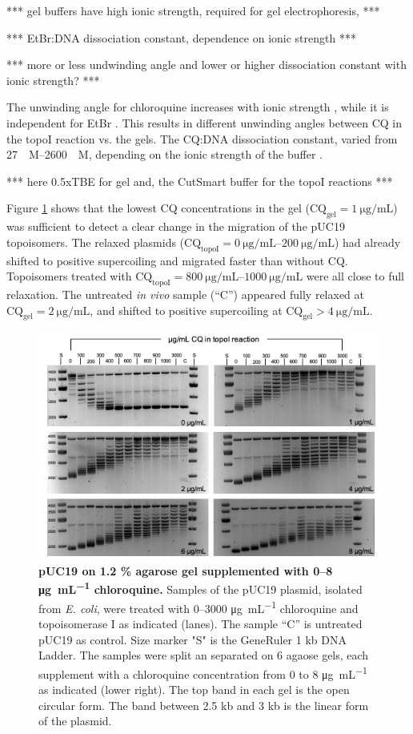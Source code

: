 \documentclass[10pt,letterpaper]{article}
\newcommand{\ugml}{\micro\gram\per\milli\liter}
\newcommand{\uM}{\micro\textsc{M}}%
\newcommand{\cqgel}{\ensuremath{\text{CQ}_{\text{gel}}}}
\newcommand{\cqtop}{\ensuremath{\text{CQ}_{\text{topoI}}}}
\newcommand{\TODO}[1]{\begingroup\color{red}*** #1 ***\endgroup}
\begin{document}
\TODO{gel buffers have high ionic strength, required for gel electrophoresis,}

\TODO{EtBr:DNA dissociation constant, dependence on ionic strength}

\TODO{more or less undwinding angle and lower or higher dissociation
  constant with ionic strength?}


The unwinding angle for chloroquine increases with ionic strength
\cite{Jones1980}, while it is independent for EtBr
. This results in different unwinding angles between CQ
in the topoI reaction vs. the gels. The CQ:DNA dissociation constant,
varied from \SIrange{27}{2600}{\uM}, depending on the ionic strength
of the buffer \cite{KwakyeBerko1989}.

\TODO{here 0.5xTBE for gel and, the CutSmart buffer for the topoI
  reactions}

Figure \ref{fig:keller} shows that the lowest CQ concentrations in the
gel ($\cqgel=\SI{1}{\ugml}$) was sufficient to detect a clear change
in the migration of the pUC19 topoisomers. The relaxed plasmids
($\cqtop=\SIrange{0}{200}{\ugml}$) had already shifted to positive
supercoiling and migrated faster than without CQ.  Topoisomers treated
with $\cqtop=\SIrange{800}{1000}{\ugml}$ were all close to full
relaxation. The untreated \textit{in vivo} sample (``C'') appeared
fully relaxed at $\cqgel=\SI{2}{\ugml}$, and shifted to positive
supercoiling at $\cqgel>\SI{4}{\ugml}$.



\begin{figure}[ht!]
    \includegraphics[width=\textwidth]{figures/keller_puc19.jpg}
  \caption{\textbf{pUC19 on 1.2 \% agarose gel supplemented with 0--8
      \si{\ugml} chloroquine.} Samples of the pUC19 plasmid, isolated
    from \textit{E. coli}, were treated with 0--3000 \si{\ugml}
    chloroquine and topoisomerase I as indicated (lanes). The sample
    “C” is untreated pUC19 as control. Size marker "S" is the
    GeneRuler 1 kb DNA Ladder. The samples were split an separated on
    6 agaose gels, each supplement with a chloroquine concentration
    from 0 to 8 \si{\ugml} as indicated (lower right). The top band
    in each gel is the open circular form. The band between  2.5 kb and 3 kb
    is the linear form of the plasmid.}
  \label{fig:keller} 
\end{figure}
\end{document}
